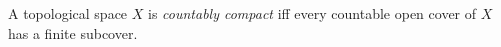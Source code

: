 A topological space $X$ is \emph{countably compact} iff every countable open cover of $X$ has a finite subcover.
